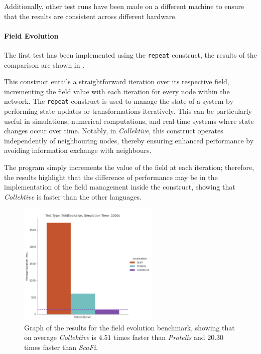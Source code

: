 Additionally, other test runs have been made on a different machine to ensure that the results are consistent across different hardware.

\paragraph{Field Evolution}
The first test has been implemented using the \texttt{repeat} construct, the results of the comparison are shown in .

This construct entails a straightforward iteration over its respective field, incrementing the field value with each
iteration for every node within the network.
The \texttt{repeat} construct is used to manage the state of a system by performing state updates or transformations iteratively.
This can be particularly useful in simulations, numerical computations, and real-time systems where state changes occur over time.
Notably, in \emph{Collektive}, this construct operates independently of neighbouring nodes, thereby ensuring enhanced
performance by avoiding information exchange with neighbours.

The program simply increments the value of the field at each iteration; therefore, the results highlight that the difference
of performance may be in the implementation of the field management inside the construct, showing that \emph{Collektive}
is faster than the other languages.

\begin{figure}[ht!]
    \centering
    \includegraphics[width=0.6\textwidth]{figures/field-evolution-results}
    \caption{Graph of the results for the field evolution benchmark, showing that on average \emph{Collektive} is $4.51$ times faster
        than \emph{Protelis} and $20.30$ times faster than \emph{ScaFi}.}
    \label{fig:field-evolution}
\end{figure}

